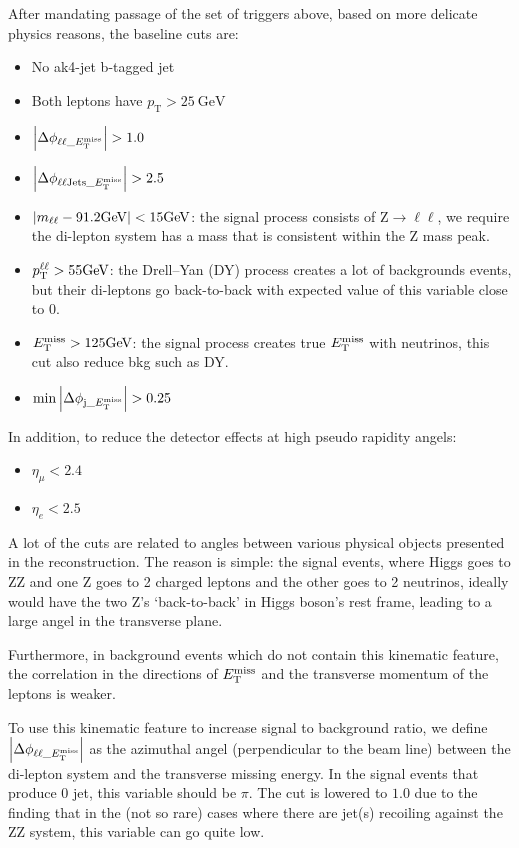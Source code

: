 After mandating passage of the set of triggers above, based on more delicate physics reasons, 
the baseline cuts are:
\begin{itemize}
    \item No ak4-jet b-tagged jet
    \item Both leptons have $p_\mathrm{T} > \SI{25}{\giga\electronvolt}$
    \item $\abs{\Delta\phi_{\ell\ell\_E_{\mathrm{T}}^{\mathrm{miss}}}} > 1.0$
    \item $\abs{\Delta\phi_{\ell\ell\mathrm{Jets}\_E_{\mathrm{T}}^{\mathrm{miss}}}} > 2.5$
    \item $\abs{m_{\ell\ell} - 91.2\si{\giga\electronvolt}} < 15\si{\giga\electronvolt}$:
        the signal process consists of $\mathrm{Z}\rightarrow{}\ell\ell$, we
        require the di-lepton system has a mass that is consistent within the Z mass peak.
    \item $p_\mathrm{T}^{\ell\ell} > 55\si{\giga\electronvolt}$: 
        the Drell–Yan (DY) process creates a lot of backgrounds events, but their di-leptons
        go back-to-back with expected value of this variable close to 0.
    \item $E_{\mathrm{T}}^{\mathrm{miss}} > 125\si{\giga\electronvolt}$:
        the signal process creates true $E_{\mathrm{T}}^{\mathrm{miss}}$ with neutrinos, this cut also reduce bkg such
        as DY.
    \item $\min{\abs{ \Delta\phi_{\mathrm{j}\_E_{\mathrm{T}}^{\mathrm{miss}}}}} > 0.25$
\end{itemize}
In addition, to reduce the detector effects at high pseudo rapidity angels:
\begin{itemize}
    \item $\eta_\mu< 2.4$
    \item $\eta_e< 2.5$
\end{itemize}

A lot of the cuts are related to angles between various physical objects presented in the
reconstruction. The reason is simple: the signal events, where Higgs goes to ZZ and one Z
goes to 2 charged leptons and the other goes to 2 neutrinos, ideally would have the two Z's 
`back-to-back' in Higgs boson's rest frame, leading to a large angel in the transverse plane.

Furthermore, in background events which do not contain this kinematic feature, the
correlation in the directions of $E_{\mathrm{T}}^{\mathrm{miss}}$ and the transverse momentum of the leptons is weaker.

To use this kinematic feature to increase signal to background ratio, we define 
$\abs{\Delta\phi_{\ell\ell\_E_{\mathrm{T}}^{\mathrm{miss}}}}$ as the azimuthal angel (perpendicular to 
the beam line) between the di-lepton system and the transverse missing energy. In the
signal events that produce 0 jet, this variable should be $\pi$. The cut is lowered to $1.0$ 
due to the finding that in the (not so rare) cases where there are jet(s) recoiling against
the ZZ system, this variable can go quite low.

